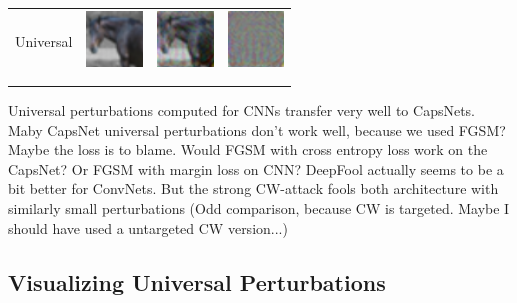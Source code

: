 \documentclass{article}
\begin{document}
\begin{table}[h]
\begin{tabular}{rlll}
		\\
		Universal & \includegraphics[height=1.5cm, align=c]{figures/universal_orig.pdf} & \includegraphics[height=1.5cm, align=c]{figures/universal_adversarial.pdf} & \includegraphics[height=1.5cm, align=c]{figures/universal_diff.pdf}\\
		\\
		\vspace{0.1cm}\\
	\end{tabular}
	\label{tab:images}
\end{table}

Universal perturbations computed for CNNs transfer very well to CapsNets. Maby CapsNet universal perturbations don't work well, because we used FGSM? Maybe the loss is to blame. Would FGSM with cross entropy loss work on the CapsNet? Or FGSM with margin loss on CNN?
DeepFool actually seems to be a bit better for ConvNets. But the strong CW-attack fools both architecture with similarly small perturbations (Odd comparison, because CW is targeted. Maybe I should have used a untargeted CW version...)

\subsection{Visualizing Universal Perturbations}
\end{document}
